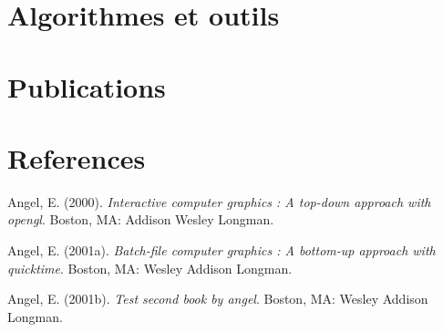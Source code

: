 \documentclass[12pt,twoside]{reedthesis}
\newlength{\cslhangindent}
\newenvironment{cslreferences}%
  {\setlength{\parindent}{0pt}%
  \everypar{\setlength{\hangindent}{\cslhangindent}}\ignorespaces}%
  {\par}
\begin{document}
\hypertarget{algo-tools}{%
\chapter{Algorithmes et outils}\label{algo-tools}}

\hypertarget{pubs}{%
\chapter{Publications}\label{pubs}}

\backmatter

\hypertarget{references}{%
\chapter*{References}\label{references}}


\noindent

\setlength{\parindent}{-0.20in}
\setlength{\leftskip}{0.20in}
\setlength{\parskip}{8pt}

\hypertarget{refs}{}
\begin{cslreferences}
\leavevmode\hypertarget{ref-angel2000}{}%
Angel, E. (2000). \emph{Interactive computer graphics : A top-down approach with opengl}. Boston, MA: Addison Wesley Longman.

\leavevmode\hypertarget{ref-angel2001}{}%
Angel, E. (2001a). \emph{Batch-file computer graphics : A bottom-up approach with quicktime}. Boston, MA: Wesley Addison Longman.

\leavevmode\hypertarget{ref-angel2002a}{}%
Angel, E. (2001b). \emph{Test second book by angel}. Boston, MA: Wesley Addison Longman.
\end{cslreferences}

\end{document}
